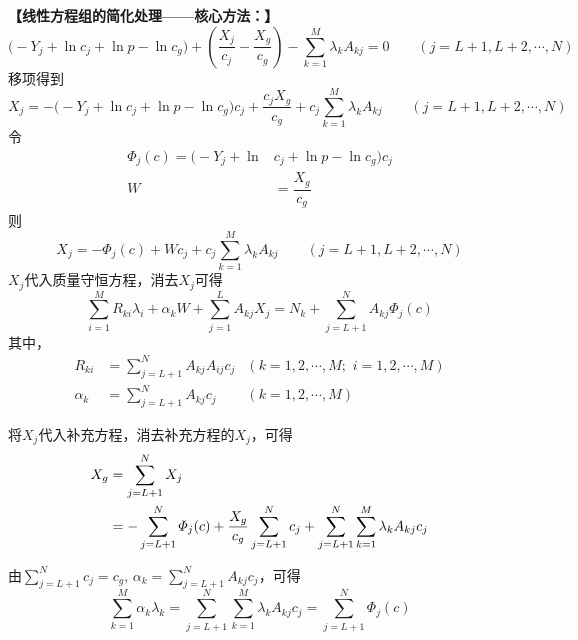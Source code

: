 \noindent \textbf{【线性方程组的简化处理——核心方法：\red[消去气相组元$X_j\,\,(j = L + 1, L+2, \cdots , N )$]】}
\begin{equation}
	\big(-Y_j +\ln c_j  +\ln p - \ln c_g\big) +\left( \dfrac{X_j}{c_j} - \dfrac{X_g}{c_g}\right) - \sum_{k = 1}^{M} \lambda_k A_{kj} = 0 \qquad (j = L+1, L+2, \cdots, N) 
\end{equation}
移项得到
\begin{equation}
	X_j = -\big(-Y_j + \ln c_j + \ln p -\ln c_g \big)c_j + \dfrac{c_j X_g}{c_g} + c_j \sum_{k = 1}^{M}\lambda_k A_{kj} \qquad (j = L+1, L+2, \cdots, N)
\end{equation}
令
\begin{equation*}
	\begin{aligned}
		\varPhi_j(c) =  \big(- Y_j + \ln & c_j + \ln p - \ln c_g \big)c_j \\
		W &= \dfrac{X_g}{c_g}
	\end{aligned}
\end{equation*}
则
\begin{equation}
	X_j = - \varPhi_j(c) + Wc_j + c_j \sum_{k = 1}^{M}\lambda_k A_{kj} \qquad (j = L+1, L+2, \cdots, N)
\end{equation}
$X_j$代入质量守恒方程，消去$X_j$可得
\begin{equation}
	\sum_{i = 1}^{M}R_{ki}\lambda_i + \alpha_k W + \sum_{j = 1}^{L} A_{kj}X_j =  N_k + \sum_{j = L +1}^{N}A_{kj}\varPhi_j(c)
\end{equation}
其中，
\begin{equation*}
	\begin{aligned}
		\displaystyle R_{ki} &= \sum_{j = L+1}^{N} A_{kj}A_{ij}c_j &(k = 1,2,\cdots,M;\,\, i = 1,2,\cdots, M)\\[0.5em]
		\displaystyle \alpha_k &= \sum_{j = L+1}^{N}A_{kj}c_{j} &(k  = 1,2, \cdots, M)
	\end{aligned}
\end{equation*}
\vspace*{0.5em}

将$X_j$代入补充方程，消去补充方程的$X_j$，可得
\begin{align}
	X_g & = \sum_{j = L +1}^{N} X_j \notag \\
	& =  - \sum_{j = L + 1}^{N} \varPhi_j(c) + \dfrac{X_g}{c_g}\sum_{j = L + 1}^{N}  c_j + \sum_{j = L + 1}^{N} \sum_{k = 1}^{M}\lambda_k A_{kj}c_j
\end{align}

由$\displaystyle \sum_{j = L+1}^{N} c_j = c_g,\, \alpha_k = \sum_{j = L+1}^{N}A_{kj}c_{j}$，可得
\begin{equation}
	\sum_{k = 1}^{M} \alpha_k \lambda_k = \sum_{j = L + 1}^{N} \sum_{k = 1}^{M}\lambda_k A_{kj}c_j = \sum_{j = L+1}^{N}\varPhi_j(c) 
\end{equation}

